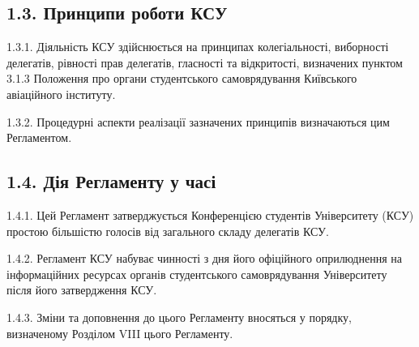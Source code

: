 \subsection*{1.3. Принципи роботи КСУ}
    1.3.1. Діяльність КСУ здійснюється на принципах колегіальності, виборності делегатів, рівності прав делегатів, гласності та відкритості, визначених пунктом 3.1.3 Положення про органи студентського самоврядування Київського авіаційного інституту.

    1.3.2. Процедурні аспекти реалізації зазначених принципів визначаються цим Регламентом.

\subsection*{1.4. Дія Регламенту у часі}
    1.4.1. Цей Регламент затверджується Конференцією студентів Університету (КСУ) простою більшістю голосів від загального складу делегатів КСУ.

    1.4.2. Регламент КСУ набуває чинності з дня його офіційного оприлюднення на інформаційних ресурсах органів студентського самоврядування Університету після його затвердження КСУ.

    1.4.3. Зміни та доповнення до цього Регламенту вносяться у порядку, визначеному Розділом VIII цього Регламенту.